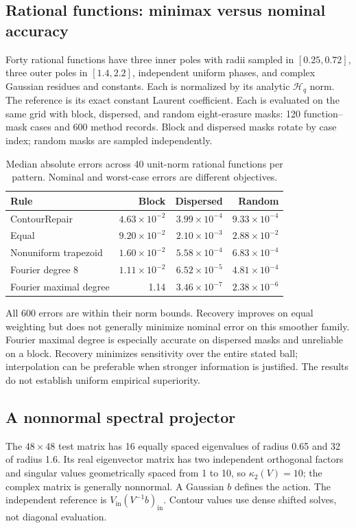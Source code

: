 \documentclass[final,leqno,letterpaper]{etna}
\newcommand{\Hq}{\mathcal H_q}\newcommand{\E}{\mathcal E}
\begin{document}
\FloatBarrier
\subsection{Rational functions: minimax versus nominal accuracy}
Forty rational functions have three inner poles with radii sampled in $[0.25,0.72]$, three outer poles in $[1.4,2.2]$, independent uniform phases, and complex Gaussian residues and constants. Each is normalized by its analytic $\Hq$ norm. The reference is its exact constant Laurent coefficient. Each is evaluated on the same grid with block, dispersed, and random eight-erasure masks: 120 function--mask cases and 600 method records. Block and dispersed masks rotate by case index; random masks are sampled independently.

\begin{table}[htbp]\centering
\caption{Median absolute errors across 40 unit-norm rational functions per pattern. Nominal and worst-case errors are different objectives.}\label{tab:rational}
\begin{tabular}{lrrr}\toprule
Rule & Block & Dispersed & Random\\\midrule
ContourRepair & $4.63\times10^{-2}$ & $3.99\times10^{-4}$ & $9.33\times10^{-4}$\\
Equal & $9.20\times10^{-2}$ & $2.10\times10^{-3}$ & $2.88\times10^{-2}$\\
Nonuniform trapezoid & $1.60\times10^{-2}$ & $5.58\times10^{-4}$ & $6.83\times10^{-4}$\\
Fourier degree 8 & $1.11\times10^{-2}$ & $6.52\times10^{-5}$ & $4.81\times10^{-4}$\\
Fourier maximal degree & 1.14 & $3.46\times10^{-7}$ & $2.38\times10^{-6}$\\\bottomrule
\end{tabular}
\end{table}
All 600 errors are within their norm bounds. Recovery improves on equal weighting but does not generally minimize nominal error on this smoother family. Fourier maximal degree is especially accurate on dispersed masks and unreliable on a block. Recovery minimizes sensitivity over the entire stated ball; interpolation can be preferable when stronger information is justified. The results do not establish uniform empirical superiority.

\FloatBarrier
\subsection{A nonnormal spectral projector}
The $48\times48$ test matrix has 16 equally spaced eigenvalues of radius 0.65 and 32 of radius 1.6. Its real eigenvector matrix has two independent orthogonal factors and singular values geometrically spaced from 1 to 10, so $\kappa_2(V)=10$; the complex matrix is generally nonnormal. A Gaussian $b$ defines the action. The independent reference is $V_{\mathrm{in}}(V^{-1}b)_{\mathrm{in}}$. Contour values use dense shifted solves, not diagonal evaluation.
\end{document}
